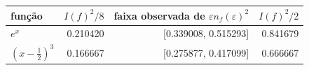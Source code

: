 \begin{tabular}{lrrr}
\toprule
função & $I(f)^2/8$ & faixa observada de $\varepsilon n_f(\varepsilon)^2$ & $I(f)^2/2$ \\
\midrule
$e^x$ & 0.210420 & [0.339008, 0.515293] & 0.841679 \\
$(x-\frac{1}{2})^3$ & 0.166667 & [0.275877, 0.417099] & 0.666667 \\
\bottomrule
\end{tabular}
